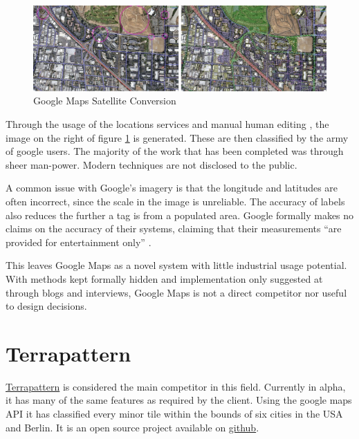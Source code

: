 \begin{figure}[H]
    \centering
    \includegraphics[width=\textwidth]{figs/2/googlemaps}
    \caption{Google Maps Satellite Conversion}
    \label{fig:googlemaps}
\end{figure}

Through the usage of the locations services and manual human editing \citep{google:wired}, the image on the right of figure \ref{fig:googlemaps} is generated. These are then classified by the army of google users. The majority of the work that has been completed was through sheer man-power. Modern techniques are not disclosed to the public. 

A common issue with Google's imagery is that the longitude and latitudes are often incorrect, since the scale in the image is unreliable. The accuracy of labels also reduces the further a tag is from a populated area. Google formally makes no claims on the accuracy of their systems, claiming that their measurements “are provided for entertainment only” \citep{google:forum}.

This leaves Google Maps as a novel system with little industrial usage potential. With methods kept formally hidden and implementation only suggested at through blogs and interviews, Google Maps is not a direct competitor nor useful to design decisions. 







\newpage
\section{Terrapattern} \label{section:existing:terrapattern}
\href{http://www.terrapattern.com/}{Terrapattern} is considered the main competitor in this field. Currently in alpha, it has many of the same features as required by the client. Using the google maps API it has classified every minor tile within the bounds of six cities in the USA and Berlin. It is an open source project available on \href{https://github.com/CreativeInquiry/terrapattern}{github}. 

